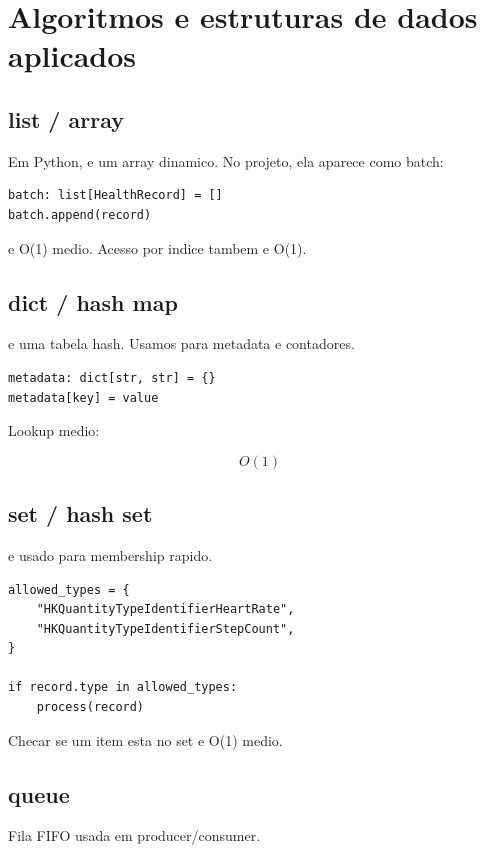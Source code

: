 \chapter{Algoritmos e estruturas de dados aplicados}

\section{list / array}

Em Python,  e um array dinamico. No projeto, ela aparece como batch:

\begin{lstlisting}[style=devbutterpython]
batch: list[HealthRecord] = []
batch.append(record)
\end{lstlisting}

 e O(1) medio. Acesso por indice tambem e O(1).

\section{dict / hash map}

 e uma tabela hash. Usamos para metadata e contadores.

\begin{lstlisting}[style=devbutterpython]
metadata: dict[str, str] = {}
metadata[key] = value
\end{lstlisting}

Lookup medio:

\[
O(1)
\]

\section{set / hash set}

 e usado para membership rapido.

\begin{lstlisting}[style=devbutterpython]
allowed_types = {
    "HKQuantityTypeIdentifierHeartRate",
    "HKQuantityTypeIdentifierStepCount",
}

if record.type in allowed_types:
    process(record)
\end{lstlisting}

Checar se um item esta no set e O(1) medio.

\section{queue}

Fila FIFO usada em producer/consumer.

